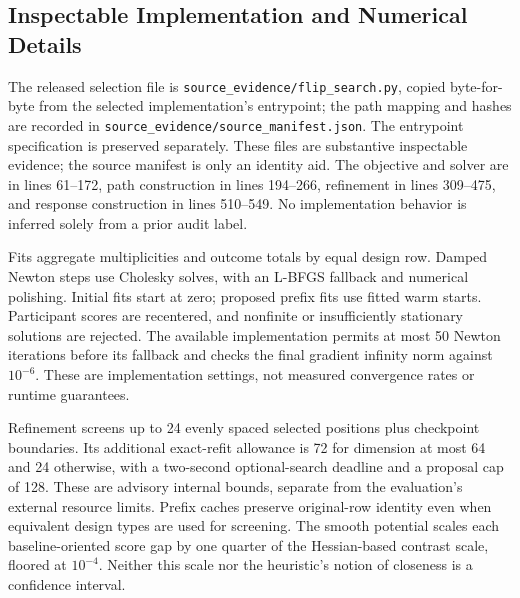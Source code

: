 \documentclass{article}
\begin{document}
\subsection{Inspectable Implementation and Numerical Details}
The released selection file is \texttt{source\_evidence/flip\_search.py}, copied byte-for-byte from the selected implementation's entrypoint; the path mapping and hashes are recorded in \texttt{source\_evidence/source\_manifest.json}. The entrypoint specification is preserved separately. These files are substantive inspectable evidence; the source manifest is only an identity aid. The objective and solver are in lines 61--172, path construction in lines 194--266, refinement in lines 309--475, and response construction in lines 510--549. No implementation behavior is inferred solely from a prior audit label.

Fits aggregate multiplicities and outcome totals by equal design row. Damped Newton steps use Cholesky solves, with an L-BFGS fallback and numerical polishing. Initial fits start at zero; proposed prefix fits use fitted warm starts. Participant scores are recentered, and nonfinite or insufficiently stationary solutions are rejected. The available implementation permits at most 50 Newton iterations before its fallback and checks the final gradient infinity norm against $10^{-6}$. These are implementation settings, not measured convergence rates or runtime guarantees.

Refinement screens up to 24 evenly spaced selected positions plus checkpoint boundaries. Its additional exact-refit allowance is 72 for dimension at most 64 and 24 otherwise, with a two-second optional-search deadline and a proposal cap of 128. These are advisory internal bounds, separate from the evaluation's external resource limits. Prefix caches preserve original-row identity even when equivalent design types are used for screening. The smooth potential scales each baseline-oriented score gap by one quarter of the Hessian-based contrast scale, floored at $10^{-4}$. Neither this scale nor the heuristic's notion of closeness is a confidence interval.
\end{document}
